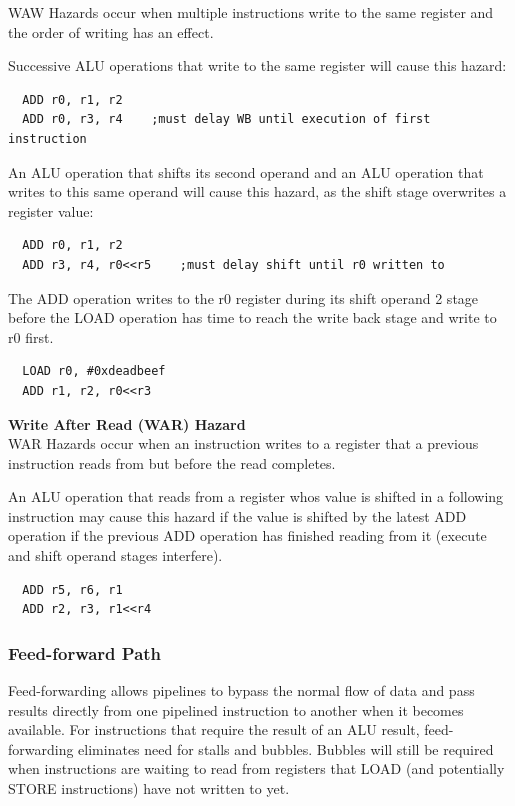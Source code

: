\documentclass[a4paper, 12pt, oneside]{book}
\begin{document}
WAW Hazards occur when multiple instructions write to the same register and the order of writing has an effect.

Successive ALU operations that write to the same register will cause this hazard:
\begin{verbatim}
  ADD r0, r1, r2    
  ADD r0, r3, r4    ;must delay WB until execution of first instruction
\end{verbatim}

An ALU operation that shifts its second operand and an ALU operation that writes to this same operand will cause this hazard, as the shift stage overwrites a register value:
\begin{verbatim}
  ADD r0, r1, r2
  ADD r3, r4, r0<<r5    ;must delay shift until r0 written to
\end{verbatim}

The ADD operation writes to the r0 register during its shift operand 2 stage before the LOAD operation has time to reach the write back stage and write to r0 first.
\begin{verbatim}
  LOAD r0, #0xdeadbeef
  ADD r1, r2, r0<<r3
\end{verbatim}

\textbf{Write After Read (WAR) Hazard}\\

WAR Hazards occur when an instruction writes to a register that a previous instruction reads from but before the read completes.

An ALU operation that reads from a register whos value is shifted in a following instruction may cause this hazard if the value is shifted by the latest ADD operation if the previous ADD operation has finished reading from it (execute and shift operand stages interfere).
\begin{verbatim}
  ADD r5, r6, r1
  ADD r2, r3, r1<<r4
\end{verbatim}


\subsubsection{Feed-forward Path}

Feed-forwarding allows pipelines to bypass the normal flow of data and pass results directly from one pipelined instruction to another when it becomes available. For instructions that require the result of an ALU result, feed-forwarding eliminates need for stalls and bubbles. Bubbles will still be required when instructions are waiting to read from registers that LOAD (and potentially STORE instructions) have not written to yet.\\
\end{document}
